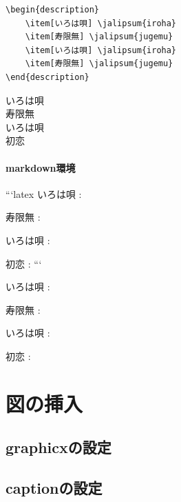 \documentclass[
    article,
    head_space=25truemm,
    foot_space=10truemm,
    gutter=15truemm]{jlreq}
\begin{document}
\begin{verbatim}
\begin{description}
    \item[いろは唄] \jalipsum{iroha}
    \item[寿限無] \jalipsum{jugemu}
    \item[いろは唄] \jalipsum{iroha}
    \item[寿限無] \jalipsum{jugemu}
\end{description}
\end{verbatim}

\begin{description}
    \item[いろは唄] 
    \item[寿限無] 
    \item[いろは唄] 
    \item[初恋] 
\end{description}

\paragraph{markdown環境}

\begin{markdown}
```latex
いろは唄
: 

寿限無
: 

いろは唄
: 

初恋
: 
```
\end{markdown}

\begin{markdown}
いろは唄
: 

寿限無
: 

いろは唄
: 

初恋
: 
\end{markdown}

\section{図の挿入}

\subsection{graphicxの設定}

\subsection{captionの設定}
\end{document}
